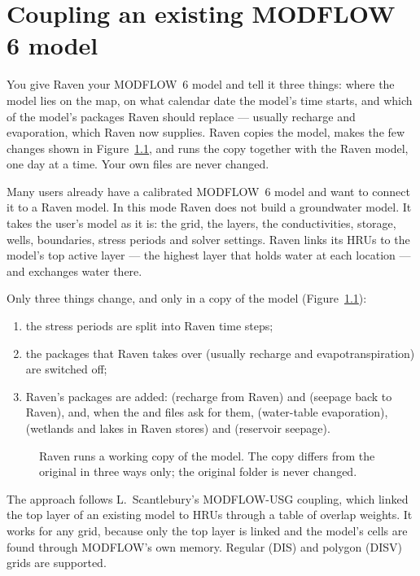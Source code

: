 \chapter{Coupling an existing MODFLOW 6 model}\label{ch:existing}

\begin{plain}
You give Raven your MODFLOW~6 model and tell it three things: where the model lies on the map, on what calendar date the
model's time starts, and which of the model's packages Raven should replace --- usually recharge and evaporation, which Raven
now supplies. Raven copies the model, makes the few changes shown in Figure~\ref{fig:workcopy}, and runs the copy together
with the Raven model, one day at a time. Your own files are never changed.
\end{plain}

Many users already have a calibrated MODFLOW~6 model and want to connect it to a Raven model. In this mode Raven does not
build a groundwater model. It takes the user's model as it is: the grid, the layers, the conductivities, storage, wells,
boundaries, stress periods and solver settings. Raven links its HRUs to the model's top active layer --- the highest layer
that holds water at each location --- and exchanges water there.

Only three things change, and only in a copy of the model (Figure~\ref{fig:workcopy}):
\begin{enumerate}
\item the stress periods are split into Raven time steps;
\item the packages that Raven takes over (usually recharge and evapotranspiration) are switched off;
\item Raven's packages are added:  (recharge from Raven) and  (seepage back to Raven), and, when
the  and  files ask for them,  (water-table evaporation),  (wetlands and lakes in
Raven stores) and  (reservoir seepage).
\end{enumerate}

\begin{figure}[!htbp]\centering
\caption{Raven runs a working copy of the model. The copy differs from the original in three ways only; the original folder is never changed.}\label{fig:workcopy}
\end{figure}

The approach follows L.~Scantlebury's MODFLOW-USG coupling, which linked the top layer of an existing model to HRUs
through a table of overlap weights. It works for any grid, because only the top layer is linked and the model's cells are
found through MODFLOW's own memory. Regular (DIS) and polygon (DISV) grids are supported.

